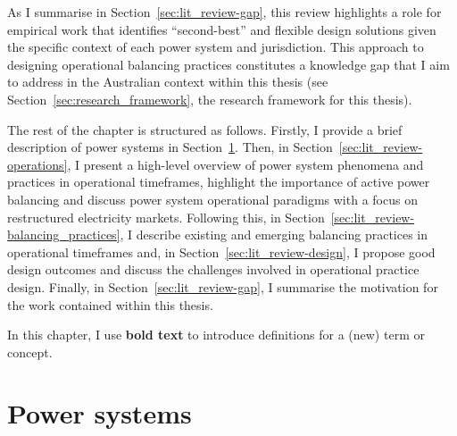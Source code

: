 \documentclass[12pt,a4paper,]{report}
\begin{document}
As I summarise in Section~\ref{sec:lit_review-gap}, this review
highlights a role for empirical work that identifies ``second-best'' and
flexible design solutions given the specific context of each power
system and jurisdiction. This approach to designing operational
balancing practices constitutes a knowledge gap that I aim to address in
the Australian context within this thesis (see
Section~\ref{sec:research_framework}, the research framework for this
thesis).

The rest of the chapter is structured as follows. Firstly, I provide a
brief description of power systems in
Section~\ref{sec:lit_review-power_systems}. Then, in
Section~\ref{sec:lit_review-operations}, I present a high-level overview
of power system phenomena and practices in operational timeframes,
highlight the importance of active power balancing and discuss power
system operational paradigms with a focus on restructured electricity
markets. Following this, in
Section~\ref{sec:lit_review-balancing_practices}, I describe existing
and emerging balancing practices in operational timeframes and, in
Section~\ref{sec:lit_review-design}, I propose good design outcomes and
discuss the challenges involved in operational practice design. Finally,
in Section~\ref{sec:lit_review-gap}, I summarise the motivation for the
work contained within this thesis.

In this chapter, I use \textbf{bold text} to introduce definitions for a
(new) term or concept.

\hypertarget{sec:lit_review-power_systems}{%
\section{Power systems}\label{sec:lit_review-power_systems}}
\end{document}
